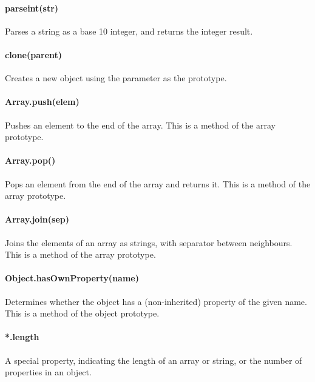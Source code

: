\documentclass[11pt]{report}
\begin{document}
\paragraph{parseint(str)} Parses a string as a base 10 integer, and returns the integer result.
\paragraph{clone(parent)} Creates a new object using the parameter as the prototype.
\paragraph{Array.push(elem)} Pushes an element to the end of the array. This is a method of the array prototype.
\paragraph{Array.pop()} Pops an element from the end of the array and returns it. This is a method of the array prototype.
\paragraph{Array.join(sep)} Joins the elements of an array as strings, with separator between neighbours. This is a method of the array prototype.
\paragraph{Object.hasOwnProperty(name)} Determines whether the object has a (non-inherited) property of the given name. This is a method of the object prototype.
\paragraph{*.length} A special property, indicating the length of an array or string, or the number of properties in an object.


\end{document}
